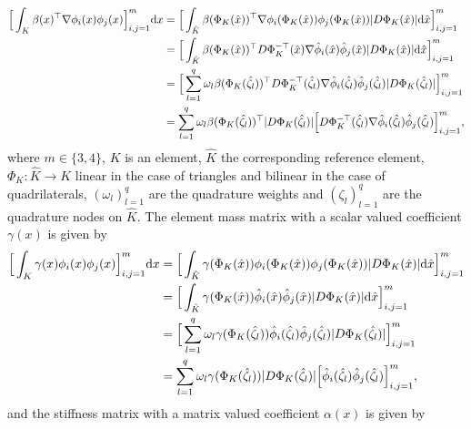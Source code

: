 \begin{align*}
\Big[\int_{K}\beta(x)^{\top} \nabla \phi_i(x) \phi_j(x)\Big]_{i,j=1}^{m} \text{d} x &= 
\Big[\int_{\hat{K}}\beta(\Phi_K(\hat{x}))^{\top} \nabla\phi_i(\Phi_K(\hat{x})) \phi_j(\Phi_K(\hat{x})) |D\Phi_K(\hat{x})| \text{d}\hat{x}\Big]_{i,j=1}^{m} \nonumber \\ 
&=\Big[\int_{\hat{K}}\beta(\Phi_K(\hat{x}))^{\top} D\Phi_K^{-\top} (\hat{x})\nabla\hat{\phi}_i(\hat{x}) \hat{\phi}_j(\hat{x}) |D\Phi_K(\hat{x})| \text{d}\hat{x}\Big]_{i,j=1}^{m} \nonumber \\ 
&=\Big[\sum_{l=1}^{q}\omega_l\beta(\Phi_K(\hat{\zeta_l}))^{\top} D\Phi_K^{-\top}(\hat{\zeta_l})\nabla\hat{\phi}_i(\hat{\zeta_l}) \hat{\phi}_j(\hat{\zeta_l}) |D\Phi_K(\hat{\zeta_l})| \Big]_{i,j=1}^{m} \nonumber \\ 
&=\sum_{l=1}^{q}\omega_l\beta(\Phi_K(\hat{\zeta_l}))^{\top} |D\Phi_K(\hat{\zeta_l})|\Big[D\Phi_K^{-\top}(\hat{\zeta_l})\nabla\hat{\phi}_i(\hat{\zeta_l}) \hat{\phi}_j(\hat{\zeta_l}) \Big]_{i,j=1}^{m},
\end{align*}
where $m\in \{3,4\}$, $K$ is an element, $\hat{K}$ the corresponding reference element, $\Phi_K: \hat{K} \to K$ linear in the case of triangles and bilinear in the case of quadrilaterals, $(\omega_l)_{l=1}^q$ are the quadrature weights and $(\zeta_l)_{l=1}^q$ are the quadrature nodes on $\hat{K}$. The element mass matrix with a scalar valued coefficient $\gamma(x)$ is given by
\begin{align*}
\Big[\int_{K}\gamma(x) \phi_i(x) \phi_j(x)\Big]_{i,j=1}^{m} \text{d} x &= 
\Big[\int_{\hat{K}}\gamma(\Phi_K(\hat{x})) \phi_i(\Phi_K(\hat{x})) \phi_j(\Phi_K(\hat{x})) |D\Phi_K(\hat{x})| \text{d}\hat{x}\Big]_{i,j=1}^{m} \nonumber \\ 
&=\Big[\int_{\hat{K}}\gamma(\Phi_K(\hat{x})) \hat{\phi}_i(\hat{x}) \hat{\phi}_j(\hat{x}) |D\Phi_K(\hat{x})| \text{d}\hat{x}\Big]_{i,j=1}^{m} \nonumber \\ 
&=\Big[\sum_{l=1}^{q}\omega_l\gamma(\Phi_K(\hat{\zeta_l})) \hat{\phi}_i(\hat{\zeta_l}) \hat{\phi}_j(\hat{\zeta_l}) |D\Phi_K(\hat{\zeta_l})| \Big]_{i,j=1}^{m} \nonumber \\ 
&=\sum_{l=1}^{q}\omega_l\gamma(\Phi_K(\hat{\zeta_l})) |D\Phi_K(\hat{\zeta_l})|\Big[\hat{\phi}_i(\hat{\zeta_l}) \hat{\phi}_j(\hat{\zeta_l}) \Big]_{i,j=1}^{m},
\end{align*}
and the stiffness matrix with a matrix valued coefficient $\alpha(x)$ is given by 
